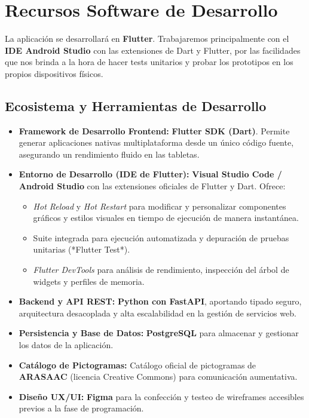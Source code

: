 \section{Recursos Software de Desarrollo}

La aplicación se desarrollará en \textbf{Flutter}. Trabajaremos principalmente con el \textbf{IDE Android Studio} con las extensiones de Dart y Flutter, por las facilidades que nos brinda a la hora de hacer tests unitarios y probar los prototipos en los propios dispositivos físicos.

\subsection{Ecosistema y Herramientas de Desarrollo}
\begin{itemize}[leftmargin=*]
  \item \textbf{Framework de Desarrollo Frontend:} \textbf{Flutter SDK (Dart)}. Permite generar aplicaciones nativas multiplataforma desde un único código fuente, asegurando un rendimiento fluido en las tabletas.
  
  \item \textbf{Entorno de Desarrollo (IDE de Flutter):} \textbf{Visual Studio Code / Android Studio} con las extensiones oficiales de Flutter y Dart. Ofrece:
    
    \begin{itemize}
      \item \textit{Hot Reload} y \textit{Hot Restart} para modificar y personalizar componentes gráficos y estilos visuales en tiempo de ejecución de manera instantánea.
      
      \item Suite integrada para ejecución automatizada y depuración de pruebas unitarias (*Flutter Test*).
      
      \item \textit{Flutter DevTools} para análisis de rendimiento, inspección del árbol de widgets y perfiles de memoria.
    \end{itemize}
  
  \item \textbf{Backend y API REST:} \textbf{Python con FastAPI}, aportando tipado seguro, arquitectura desacoplada y alta escalabilidad en la gestión de servicios web.
  
  \item \textbf{Persistencia y Base de Datos:} \textbf{PostgreSQL} para almacenar y gestionar los datos de la aplicación.

  
  \item \textbf{Catálogo de Pictogramas:} Catálogo oficial de pictogramas de \textbf{ARASAAC} (licencia Creative Commons) para comunicación aumentativa.
  
  \item \textbf{Diseño UX/UI:} \textbf{Figma} para la confección y testeo de wireframes accesibles previos a la fase de programación.
\end{itemize}
